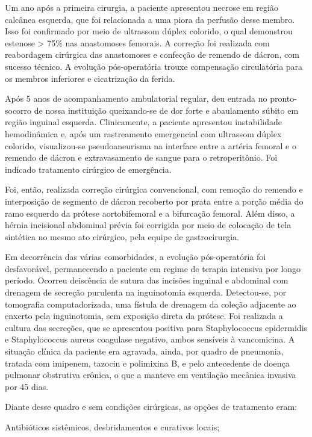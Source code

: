 \documentclass[numberinsection,times,10pt,spreadimages]{memoir}
\begin{document}
Um ano após a primeira cirurgia, a paciente apresentou necrose em região
calcânea
esquerda, que foi relacionada a uma piora da perfusão desse membro. Isso foi
confirmado por meio de ultrassom dúplex colorido, o qual demonstrou estenose >
75\% nas anastomoses femorais. A correção foi realizada com reabordagem
cirúrgica das
anastomoses e confecção de remendo de dácron, com sucesso técnico. A evolução
pós-operatória trouxe compensação circulatória para os membros inferiores e
cicatrização da ferida.

Após 5 anos de acompanhamento ambulatorial regular, deu entrada no
pronto-socorro de
nossa instituição queixando-se de dor forte e abaulamento súbito em região
inguinal
esquerda. Clinicamente, a paciente apresentou instabilidade hemodinâmica e, após
um
rastreamento emergencial com ultrassom dúplex colorido, visualizou-se
pseudoaneurisma na interface entre a artéria femoral e o remendo de dácron e
extravasamento de sangue para o retroperitônio. Foi indicado tratamento
cirúrgico de
emergência.

Foi, então, realizada correção cirúrgica convencional, com remoção do remendo e
interposição de segmento de dácron recoberto por prata entre a porção média do
ramo
esquerdo da prótese aortobifemoral e a bifurcação femoral. Além disso, a hérnia
incisional abdominal prévia foi corrigida por meio de colocação de tela
sintética no
mesmo ato cirúrgico, pela equipe de gastrocirurgia.

Em decorrência das várias comorbidades, a evolução pós-operatória foi
desfavorável,
permanecendo a paciente em regime de terapia intensiva por longo período.
Ocorreu
deiscência de sutura das incisões inguinal e abdominal com drenagem de secreção
purulenta na inguinotomia esquerda. Detectou-se, por tomografia computadorizada,
uma
fístula de drenagem da coleção adjacente ao enxerto pela inguinotomia, sem
exposição
direta da prótese. Foi realizada a cultura das secreções, que se apresentou
positiva
para Staphylococcus epidermidis e Staphylococcus
aureus coagulase negativo, ambos sensíveis à vancomicina. A situação
clínica da paciente era agravada, ainda, por quadro de pneumonia, tratada com
imipenem, tazocin e polimixina B, e pelo antecedente de doença pulmonar
obstrutiva
crônica, o que a manteve em ventilação mecânica invasiva por 45 dias.

Diante desse quadro e sem condições cirúrgicas, as opções de tratamento eram:

Antibióticos sistêmicos, desbridamentos e curativos locais;
\end{document}
